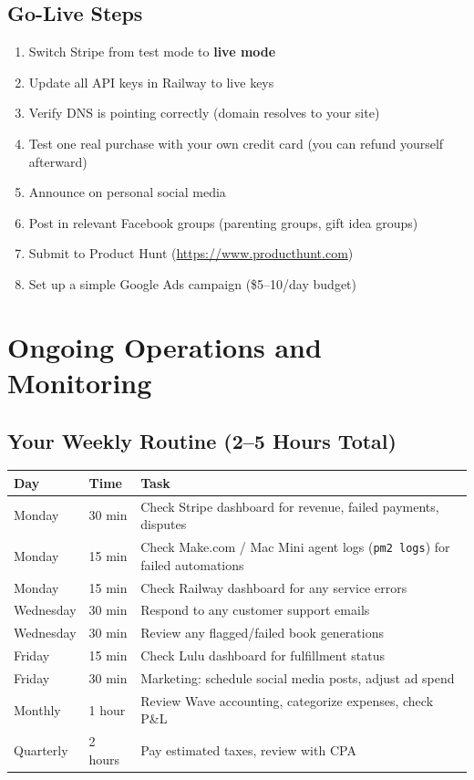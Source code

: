 \documentclass[12pt, letterpaper, oneside]{book}
\begin{document}
\section{Go-Live Steps}

\begin{enumerate}[leftmargin=2em, itemsep=4pt]
  \item Switch Stripe from test mode to \textbf{live mode}
  \item Update all API keys in Railway to live keys
  \item Verify DNS is pointing correctly (domain resolves to your site)
  \item Test one real purchase with your own credit card (you can refund yourself afterward)
  \item Announce on personal social media
  \item Post in relevant Facebook groups (parenting groups, gift idea groups)
  \item Submit to Product Hunt (\url{https://www.producthunt.com})
  \item Set up a simple Google Ads campaign (\$5--10/day budget)
\end{enumerate}


\chapter{Ongoing Operations and Monitoring}

\section{Your Weekly Routine (2--5 Hours Total)}

\begin{table}[H]
\centering
\begin{tabularx}{\textwidth}{llX}
\toprule
\textbf{Day} & \textbf{Time} & \textbf{Task} \\
\midrule
Monday & 30 min & Check Stripe dashboard for revenue, failed payments, disputes \\
Monday & 15 min & Check Make.com / Mac Mini agent logs (\texttt{pm2 logs}) for failed automations \\
Monday & 15 min & Check Railway dashboard for any service errors \\
Wednesday & 30 min & Respond to any customer support emails \\
Wednesday & 30 min & Review any flagged/failed book generations \\
Friday & 15 min & Check Lulu dashboard for fulfillment status \\
Friday & 30 min & Marketing: schedule social media posts, adjust ad spend \\
Monthly & 1 hour & Review Wave accounting, categorize expenses, check P\&L \\
Quarterly & 2 hours & Pay estimated taxes, review with CPA \\
\bottomrule
\end{tabularx}
\end{table}
\end{document}

